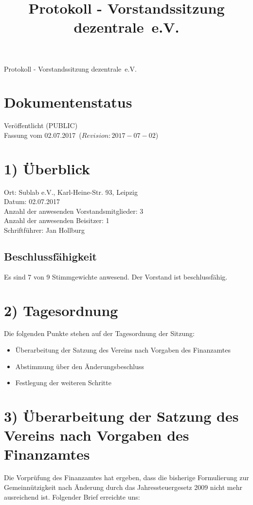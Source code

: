 \documentclass[10pt,a4paper]{scrartcl}
\newcommand{\qs}[1]{\glqq#1\grqq}
\newcommand{\name}{dezentrale}
\newcommand{\revision}{$Revision: 2017-07-02$}
\newcommand{\eventdate}{02.07.2017}
\newcommand{\schriftfuehrer}{Jan Hollburg}
\newcommand{\documentstatus}{Ver{\"o}ffentlicht (PUBLIC)}
\begin{document}
\title{Protokoll - Vorstandssitzung \qs{\name\ e.V.}}
{\LARGE Protokoll - Vorstandssitzung \qs{\name\ e.V.}}

\section*{Dokumentenstatus}
\documentstatus\\
Fassung vom \eventdate\ (\revision)

\section*{1) {\"U}berblick}
    Ort: Sublab e.V., Karl-Heine-Str. 93, Leipzig\\
    Datum: \eventdate\\
    Anzahl der anwesenden Vorstandsmitglieder: 3\\
    Anzahl der anwesenden Beisitzer: 1\\
    Schriftf{\"u}hrer: \schriftfuehrer
\subsection*{Beschlussf{\"a}higkeit}
    Es sind 7 von 9 Stimmgewichte anwesend. Der Vorstand ist beschlussf{\"a}hig.

\section*{2) Tagesordnung}
    Die folgenden Punkte stehen auf der Tagesordnung der Sitzung:
    \begin{itemize}
        \item {\"U}berarbeitung der Satzung des Vereins nach Vorgaben des Finanzamtes
        \item Abstimmung {\"u}ber den {\"A}nderungsbeschluss
        \item Festlegung der weiteren Schritte
    \end{itemize}

\section*{3) {\"U}berarbeitung der Satzung des Vereins nach Vorgaben des Finanzamtes}
    Die Vorpr{\"u}fung des Finanzamtes hat ergeben, dass die bisherige Formulierung zur
    Gemeinn{\"u}tzigkeit nach {\"A}nderung durch das Jahressteuergesetz 2009 nicht mehr ausreichend ist.
    Folgender Brief erreichte uns:
\end{document}
